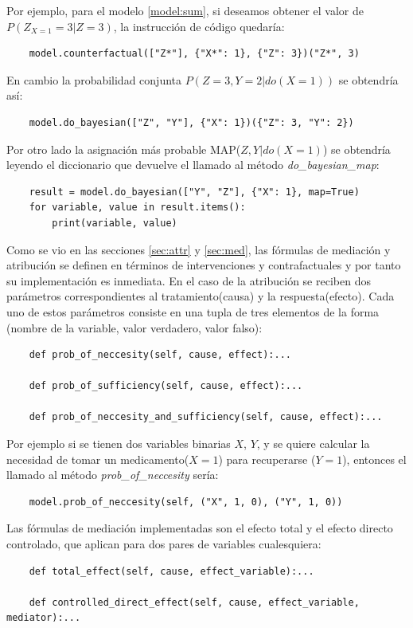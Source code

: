 Por ejemplo, para el modelo \ref{model:sum}, si deseamos obtener el valor de $P(Z_{X=1}=3 | Z=3)$, la instrucción de código quedaría:
\begin{lstlisting}
	model.counterfactual(["Z*"], {"X*": 1}, {"Z": 3})("Z*", 3)
\end{lstlisting}
En cambio la probabilidad conjunta $P(Z=3, Y=2 | do(X=1))$ se obtendría así:
\begin{lstlisting}
	model.do_bayesian(["Z", "Y"], {"X": 1})({"Z": 3, "Y": 2})
\end{lstlisting}
Por otro lado la asignación más probable MAP($Z, Y | do(X=1)$) se obtendría leyendo el diccionario que devuelve el llamado al método \textit{do\_bayesian\_map}:
\begin{lstlisting}
	result = model.do_bayesian(["Y", "Z"], {"X": 1}, map=True)
	for variable, value in result.items():
		print(variable, value)
\end{lstlisting}

Como se vio en las secciones \ref{sec:attr} y \ref{sec:med}, las fórmulas de mediación y atribución se definen en términos de intervenciones y contrafactuales y por tanto su implementación es inmediata. En el caso de la atribución se reciben dos parámetros correspondientes al tratamiento(causa) y la respuesta(efecto). Cada uno de estos parámetros consiste en una tupla de tres elementos de la forma (nombre de la variable, valor verdadero, valor falso):

\begin{lstlisting}
	def prob_of_neccesity(self, cause, effect):...
	
	def prob_of_sufficiency(self, cause, effect):...
	
	def prob_of_neccesity_and_sufficiency(self, cause, effect):...
\end{lstlisting}

Por ejemplo si se tienen dos variables binarias $X$, $Y$, y se quiere calcular la necesidad de tomar un medicamento($X=1$) para recuperarse ($Y=1$), entonces el llamado al método \textit{prob\_of\_neccesity} sería:

\begin{lstlisting}
	model.prob_of_neccesity(self, ("X", 1, 0), ("Y", 1, 0))
\end{lstlisting}

Las fórmulas de mediación implementadas son el efecto total y el efecto directo controlado, que aplican para dos pares de variables cualesquiera:

\begin{lstlisting}
	def total_effect(self, cause, effect_variable):...
	
	def controlled_direct_effect(self, cause, effect_variable, mediator):...
\end{lstlisting}

